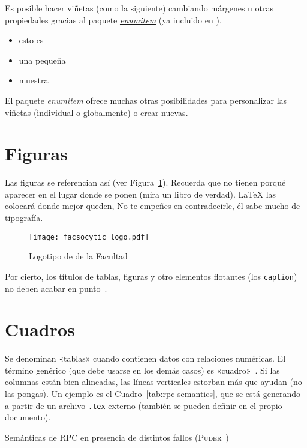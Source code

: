 Es posible hacer viñetas (como la siguiente) cambiando márgenes u otras propiedades gracias al paquete \href{http://mirror.ctan.org/macros/latex/contrib/enumitem/enumitem.pdf}{\emph{enumitem}} (ya incluido en \gitatfg).

\begin{itemize}[noitemsep, label=$\triangleright$]
  \item esto es
  \item una pequeña
  \item muestra
\end{itemize}

El paquete \emph{enumitem} ofrece muchas otras posibilidades para personalizar las viñetas (individual o globalmente) o crear nuevas.


\section{Figuras}

Las figuras se referencian así (ver Figura~\ref{fig:fac}). Recuerda que no tienen porqué aparecer en el lugar donde se ponen (mira un libro de verdad). \LaTeX{} las colocará donde mejor queden, No te empeñes en contradecirle, él sabe mucho de tipografía.

\begin{figure}[!h]
\begin{center}
  \texttt{[image: facsocytic\_logo.pdf]}
  \caption{Logotipo de de la Facultad}
  \label{fig:fac}
\end{center}
\end{figure}

Por cierto, los títulos de tablas, figuras y otro elementos flotantes (los \texttt{caption}) no deben acabar en punto~\cite{sousa}.


\section{Cuadros}
\label{sec:uncuadro}

Se denominan «tablas» cuando contienen datos con relaciones numéricas. El término genérico (que debe usarse en los demás casos) es «cuadro»~\cite{sousa}. Si las columnas están bien alineadas, las líneas verticales estorban más que ayudan (no las pongas). Un ejemplo es el Cuadro~\ref{tab:rpc-semantics}, que se está generando a partir de un archivo \texttt{.tex} externo (también se pueden definir en el propio documento).

\begin{table}[hp]
  \centering
  {\small
  
  }
  \caption[Semánticas de \acs{RPC} en presencia de distintos fallos]{Semánticas de \acs{RPC} en presencia de distintos fallos (\textsc{Puder}~\cite{puder05:_distr_system_archit})}
  \label{tab:rpc-semantics}
\end{table}


